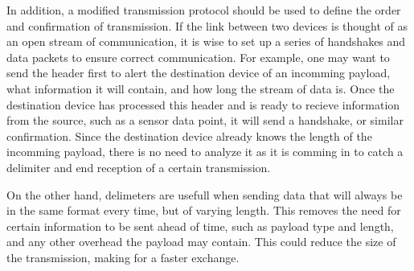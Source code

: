 In addition, a modified transmission protocol \cite{NSI:2014} should be used to define the order and confirmation of transmission. If the link between two devices is thought of as an open stream of communication, it is wise to set up a series of handshakes and data packets to ensure correct communication. For example, one may want to send the header first to alert the destination device of an incomming payload, what information it will contain, and how long the stream of data is. Once the destination device has processed this header and is ready to recieve information from the source, such as a sensor data point, it will send a handshake, or similar confirmation. Since the destination device already knows the length of the incomming payload, there is no need to analyze it as it is comming in to catch a delimiter and end reception of a certain transmission.

On the other hand, delimeters are usefull when sending data that will always be in the same format every time, but of varying length. This removes the need for certain information to be sent ahead of time, such as payload type and length, and any other overhead the payload may contain. This could reduce the size of the transmission, making for a faster exchange.






